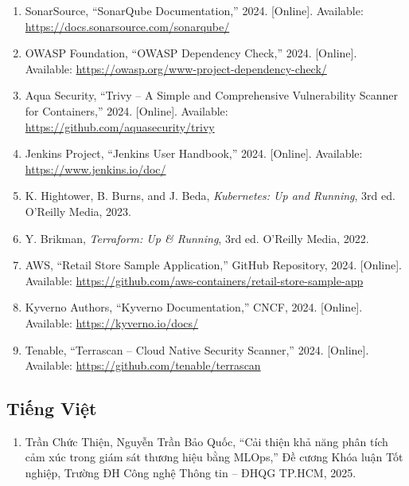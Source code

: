 \documentclass[13pt,a4paper,twoside]{extarticle}
\begin{document}
\begin{enumerate}[leftmargin=*,nosep]
  \item SonarSource, ``SonarQube Documentation,'' 2024. [Online]. Available: \url{https://docs.sonarsource.com/sonarqube/}

  \item OWASP Foundation, ``OWASP Dependency Check,'' 2024. [Online]. Available: \url{https://owasp.org/www-project-dependency-check/}

  \item Aqua Security, ``Trivy -- A Simple and Comprehensive Vulnerability Scanner for Containers,'' 2024. [Online]. Available: \url{https://github.com/aquasecurity/trivy}

  \item Jenkins Project, ``Jenkins User Handbook,'' 2024. [Online]. Available: \url{https://www.jenkins.io/doc/}

  \item K. Hightower, B. Burns, and J. Beda, \textit{Kubernetes: Up and Running}, 3rd ed. O'Reilly Media, 2023.

  \item Y. Brikman, \textit{Terraform: Up \& Running}, 3rd ed. O'Reilly Media, 2022.

  \item AWS, ``Retail Store Sample Application,'' GitHub Repository, 2024. [Online]. Available: \url{https://github.com/aws-containers/retail-store-sample-app}

  \item Kyverno Authors, ``Kyverno Documentation,'' CNCF, 2024. [Online]. Available: \url{https://kyverno.io/docs/}

  \item Tenable, ``Terrascan -- Cloud Native Security Scanner,'' 2024. [Online]. Available: \url{https://github.com/tenable/terrascan}
\end{enumerate}

\subsection*{Tiếng Việt}

\begin{enumerate}[leftmargin=*,nosep]
  \item Trần Chức Thiện, Nguyễn Trần Bảo Quốc, ``Cải thiện khả năng phân tích cảm xúc trong giám sát thương hiệu bằng MLOps,'' Đề cương Khóa luận Tốt nghiệp, Trường ĐH Công nghệ Thông tin -- ĐHQG TP.HCM, 2025.
\end{enumerate}

\newpage
\end{document}
